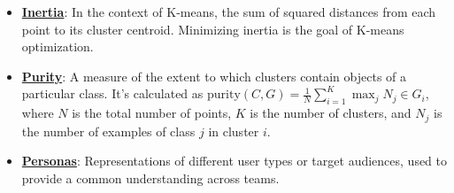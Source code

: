 \documentclass{article}%
\begin{document}
\begin{itemize}[leftmargin=*]
\item \href{https://purdue.brightspace.com/d2l/common/assets/pdfjs-d2l-dist/1.0.14-legacy/web/viewer.html?file=\%2Fcontent\%2Fenforced\%2F1095467-wl.202510.CS.24300.001\%2F12L2-distance-clusters.pdf\%3Fou\%3D1095467\&lang=en-us\&container=d2l-fileviewer-rendered-pdf\&fullscreen=d2l-fileviewer-rendered-pdf-dialog\&height=667#page=33}{\textbf{Inertia}}: In the context of K-means, the sum of squared distances from each point to its cluster centroid. Minimizing inertia is the goal of K-means optimization.%
\item \href{https://purdue.brightspace.com/d2l/common/assets/pdfjs-d2l-dist/1.0.14-legacy/web/viewer.html?file=\%2Fcontent\%2Fenforced\%2F1095467-wl.202510.CS.24300.001\%2F12L2-distance-clusters.pdf\%3Fou\%3D1095467\&lang=en-us\&container=d2l-fileviewer-rendered-pdf\&fullscreen=d2l-fileviewer-rendered-pdf-dialog\&height=667#page=44}{\textbf{Purity}}: A measure of the extent to which clusters contain objects of a particular class. It's calculated as $\text{purity}(C, G) = \frac{1}{N} \sum_{i=1}^{K} \max_j N_j \in G_i$, where $N$ is the total number of points, $K$ is the number of clusters, and $N_j$ is the number of examples of class $j$ in cluster $i$.%
\item \href{https://purdue.brightspace.com/d2l/common/assets/pdfjs-d2l-dist/1.0.14-legacy/web/viewer.html?file=\%2Fcontent\%2Fenforced\%2F1095467-wl.202510.CS.24300.001\%2F12L2-distance-clusters.pdf\%3Fou\%3D1095467\&lang=en-us\&container=d2l-fileviewer-rendered-pdf\&fullscreen=d2l-fileviewer-rendered-pdf-dialog\&height=667#page=11}{\textbf{Personas}}: Representations of different user types or target audiences, used to provide a common understanding across teams.%
\end{itemize}%
\end{document}
